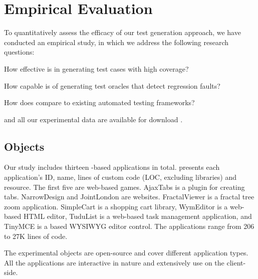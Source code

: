 \section{Empirical Evaluation} \label{Sec:evaluation}

To quantitatively assess the efficacy of our test generation approach, we have conducted an empirical study, in which we address the following research questions:



\begin{description}[noitemsep]
\item [RQ1] How effective is \jseft in generating test cases with high coverage? 
\item [RQ2] How capable is \jseft of generating test oracles that detect regression faults?
\item [RQ3] How does \jseft compare to existing automated \javascript testing frameworks?
\end{description} 


\jseft and all our experimental data are available for download \cite{jseft-dl}.



\subsection{Objects}
Our study includes thirteen \javascript-based applications in total. 
 presents each application's ID, name, lines of custom \javascript code (LOC, excluding \javascript libraries) and resource.
The first five are web-based games. AjaxTabs is a \jquery plugin for creating tabs. NarrowDesign and JointLondon are websites. FractalViewer is a fractal tree zoom application. SimpleCart is a  shopping cart library, WymEditor is a web-based HTML editor, Tudu\-List is a web-based task management application, and Tiny\-MCE is a \javascript based WYSIWYG editor control. The applications range from 206 to 27K lines of \javascript code.

The experimental objects are open-source and cover different application types. All the applications are interactive in nature and extensively use \javascript on the client-side. %


